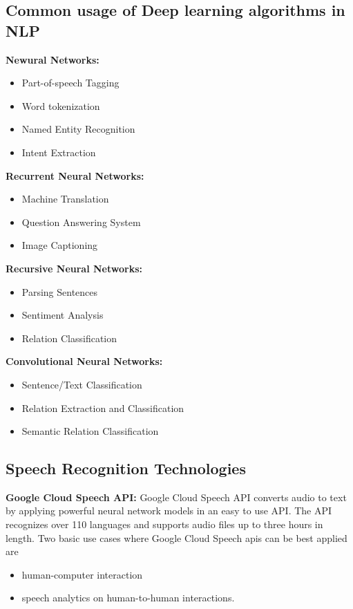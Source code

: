 \documentclass[sigconf]{acmart}
\begin{document}
\subsection{Common usage of Deep learning algorithms in NLP}
\par\null\par
\textbf{Newural Networks:}
  \begin{itemize} 
    \item Part-of-speech Tagging
    \item Word tokenization
    \item Named Entity Recognition
    \item Intent Extraction
  \end{itemize} 
\textbf{Recurrent Neural Networks:}
  \begin{itemize} 
    \item Machine Translation
    \item Question Answering System
    \item Image Captioning
  \end{itemize} 
\textbf{Recursive Neural Networks:}
  \begin{itemize} 
    \item Parsing Sentences
    \item Sentiment Analysis
    \item Relation Classification
  \end{itemize} 
\textbf{Convolutional Neural Networks:}
  \begin{itemize} 
    \item Sentence/Text Classification
    \item Relation Extraction and Classification
    \item Semantic Relation Classification
  \end{itemize} 
\subsection{Speech Recognition Technologies}     
\textbf{Google Cloud Speech API:} Google Cloud Speech API converts audio to text by applying powerful neural network models in an easy to use API. The API recognizes over 110 languages and supports audio files up to three hours in length. Two basic use cases where Google Cloud Speech apis can be best applied are
  \begin{itemize}
  \item human-computer interaction 
  \item speech analytics on human-to-human interactions.
  \end{itemize} 
\end{document}
